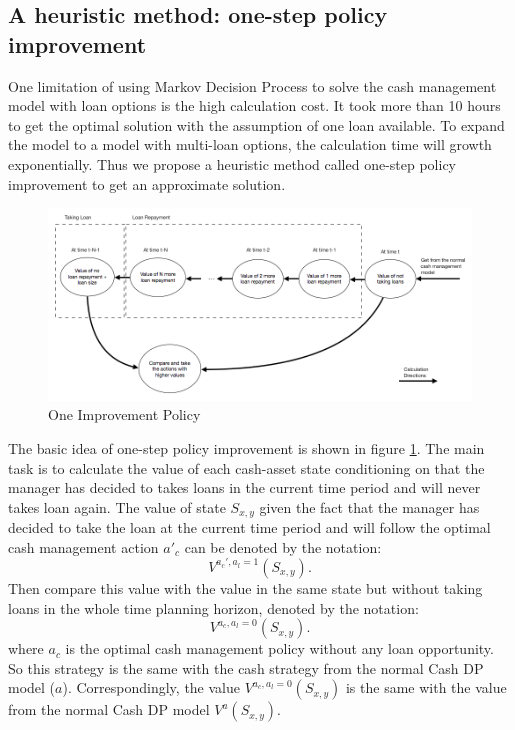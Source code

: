 \documentclass[12pt]{article}
\begin{document}
\subsection{A heuristic method: one-step policy improvement}
One limitation of using Markov Decision Process to solve the cash management model with loan options is the high calculation cost. It took more than 10 hours to get the optimal solution with the assumption of one loan available. To expand the model to a model with multi-loan options, the calculation time will growth exponentially. Thus we propose a heuristic method called one-step policy improvement to get an approximate solution.
\begin{figure}
\begin{center}
\includegraphics[scale=.4]{oneImprov}
\end{center}
\caption{One Improvement Policy}
\label{oneImprov}
\end{figure}

The basic idea of one-step policy improvement is shown in figure \ref{oneImprov}. The main task is to calculate the value of each cash-asset state conditioning on that the manager has decided to takes loans in the current time period and will never takes loan again. The value of state $S_{x,y}$ given the fact that the manager has decided to take the loan at the current time period and will follow the optimal cash management action $a'_c$ can be denoted by the notation: $$V^{{a_c}', a_l = 1}(S_{x,y}).$$
Then compare this value with the value in the same state but without taking loans in the whole time planning horizon, denoted by the notation: $$V^{{a_c}, a_l = 0}(S_{x,y}).$$ where $a_c$ is the optimal cash management policy without any loan opportunity. So this strategy is the same with the cash strategy from the normal Cash DP model ($a$). Correspondingly, the value $V^{{a_c}, a_l = 0}(S_{x,y})$ is the same with the value from the normal Cash DP model $V^a(S_{x,y}).$
\end{document}
